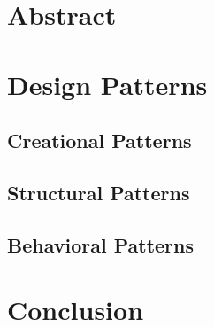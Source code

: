 \documentclass[11pt, oneside, a4paper]{book}
\begin{document}
\pagestyle{empty}

\frontmatter


\tableofcontents

\mainmatter


\part{Abstract}



\part{Design Patterns}
\chapter{Creational Patterns}


\chapter{Structural Patterns}


\chapter{Behavioral Patterns}



\part{Conclusion}



\end{document}
